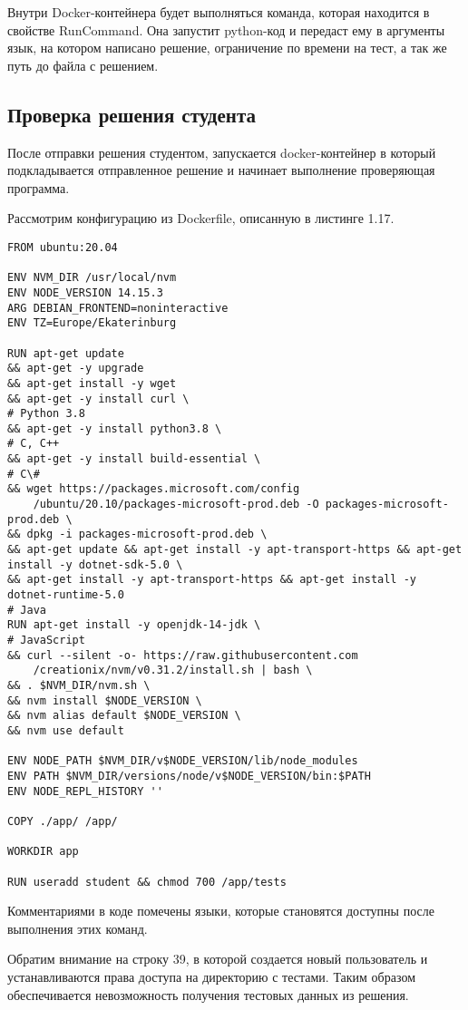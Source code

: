 Внутри Docker-контейнера будет выполняться команда, которая находится в свойстве RunCommand. Она запустит python-код и передаст ему в аргументы язык, на котором написано решение, ограничение по времени на тест, а так же путь до файла с решением.

\subsection{Проверка решения студента}

После отправки решения студентом, запускается docker-контейнер в который подкладывается отправленное решение и начинает выполнение проверяющая программа. 

Рассмотрим конфигурацию из Dockerfile, описанную в листинге 1.17.

\begin{lstlisting}[caption={Конфигурация docker-образа}]
FROM ubuntu:20.04

ENV NVM_DIR /usr/local/nvm
ENV NODE_VERSION 14.15.3
ARG DEBIAN_FRONTEND=noninteractive
ENV TZ=Europe/Ekaterinburg

RUN apt-get update 
&& apt-get -y upgrade
&& apt-get install -y wget 
&& apt-get -y install curl \
# Python 3.8
&& apt-get -y install python3.8 \ 
# C, C++
&& apt-get -y install build-essential \
# C\#
&& wget https://packages.microsoft.com/config
    /ubuntu/20.10/packages-microsoft-prod.deb -O packages-microsoft-prod.deb \
&& dpkg -i packages-microsoft-prod.deb \
&& apt-get update && apt-get install -y apt-transport-https && apt-get install -y dotnet-sdk-5.0 \
&& apt-get install -y apt-transport-https && apt-get install -y dotnet-runtime-5.0
# Java
RUN apt-get install -y openjdk-14-jdk \
# JavaScript
&& curl --silent -o- https://raw.githubusercontent.com
    /creationix/nvm/v0.31.2/install.sh | bash \
&& . $NVM_DIR/nvm.sh \
&& nvm install $NODE_VERSION \
&& nvm alias default $NODE_VERSION \
&& nvm use default

ENV NODE_PATH $NVM_DIR/v$NODE_VERSION/lib/node_modules
ENV PATH $NVM_DIR/versions/node/v$NODE_VERSION/bin:$PATH
ENV NODE_REPL_HISTORY ''

COPY ./app/ /app/

WORKDIR app

RUN useradd student && chmod 700 /app/tests
\end{lstlisting}

Комментариями в коде помечены языки, которые становятся доступны после выполнения этих команд. 

Обратим внимание на строку 39, в которой создается новый пользователь и устанавливаются права доступа на директорию с тестами. Таким образом обеспечивается невозможность получения тестовых данных из решения.

